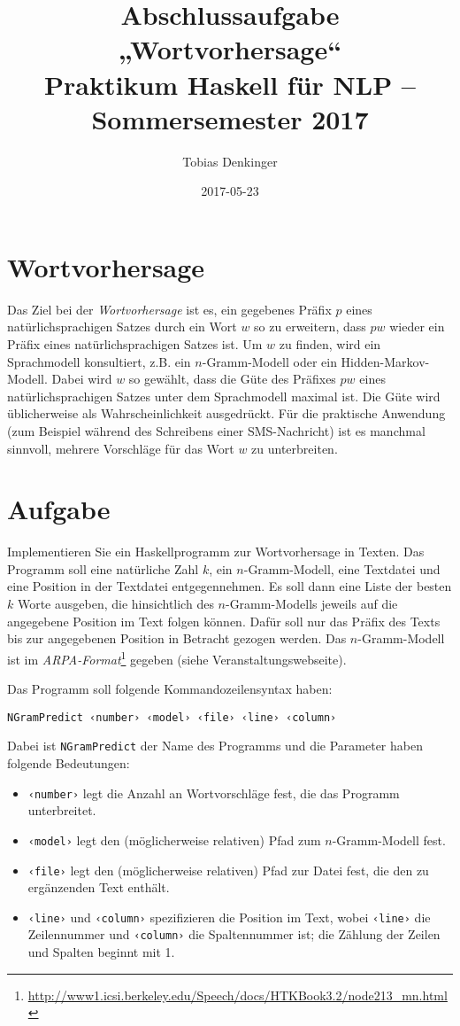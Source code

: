 \documentclass{scrartcl}
\author{Tobias Denkinger}
\date{2017-05-23}
\title{Abschlussaufgabe „Wortvorhersage“\\\medskip
\large Praktikum Haskell für NLP – Sommersemester 2017}
\begin{document}
\maketitle

\section*{Wortvorhersage}
\label{sec:orgd47786e}

Das Ziel bei der \emph{Wortvorhersage} ist es, ein gegebenes Präfix \(p\) eines natürlichsprachigen Satzes durch ein Wort \(w\) so zu erweitern, dass \(pw\) wieder ein Präfix eines natürlichsprachigen Satzes ist.  Um \(w\) zu finden, wird ein Sprachmodell konsultiert, z.B. ein \(n\)-Gramm-Modell oder ein Hidden-Markov-Modell.  Dabei wird \(w\) so gewählt, dass die Güte des Präfixes \(pw\) eines natürlichsprachigen Satzes unter dem Sprachmodell maximal ist.  Die Güte wird üblicherweise als Wahrscheinlichkeit ausgedrückt.  Für die praktische Anwendung (zum Beispiel während des Schreibens einer SMS-Nachricht) ist es manchmal sinnvoll, mehrere Vorschläge für das Wort \(w\) zu unterbreiten.


\section*{Aufgabe}
\label{sec:org8a36f41}

Implementieren Sie ein Haskellprogramm zur Wortvorhersage in Texten.  Das Programm soll eine natürliche Zahl \(k\), ein \(n\)-Gramm-Modell, eine Textdatei und eine Position in der Textdatei entgegennehmen.  Es soll dann eine Liste der besten \(k\) Worte ausgeben, die hinsichtlich des \(n\)-Gramm-Modells jeweils auf die angegebene Position im Text folgen können.  Dafür soll nur das Präfix des Texts bis zur angegebenen Position in Betracht gezogen werden.  Das \(n\)-Gramm-Modell \cite{CheGoo96} ist im \emph{ARPA-Format}\footnote{\url{http://www1.icsi.berkeley.edu/Speech/docs/HTKBook3.2/node213\_mn.html}} gegeben (siehe Veranstaltungswebseite).

Das Programm soll folgende Kommandozeilensyntax haben:
\begin{verbatim}
NGramPredict ‹number› ‹model› ‹file› ‹line› ‹column›
\end{verbatim}
Dabei ist \texttt{NGramPredict} der Name des Programms und die Parameter haben folgende Bedeutungen:
\begin{itemize}
\item \texttt{‹number›} legt die Anzahl an Wortvorschläge fest, die das Programm unterbreitet.
\item \texttt{‹model›} legt den (möglicherweise relativen) Pfad zum \(n\)-Gramm-Modell fest.
\item \texttt{‹file›} legt den (möglicherweise relativen) Pfad zur Datei fest, die den zu ergänzenden Text enthält.
\item \texttt{‹line›} und \texttt{‹column›} spezifizieren die Position im Text, wobei \texttt{‹line›} die Zeilennummer und \texttt{‹column›} die Spaltennummer ist; die Zählung der Zeilen und Spalten beginnt mit 1.
\end{itemize}
\end{document}
